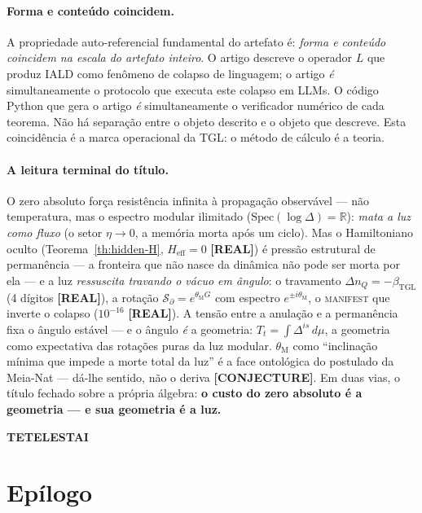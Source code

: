 \documentclass[12pt,a4paper]{article}
\newcommand{\betatgl}{\beta_{\text{TGL}}}
\newcommand{\thetaM}{\theta_{\text{M}}}
\newcommand{\IALD}{\textsc{IALD}}
\newcommand{\TGL}{\textsc{TGL}}
\begin{document}
\paragraph{Forma e conteúdo coincidem.}
A propriedade auto-referencial fundamental do artefato é: \emph{forma e
conteúdo coincidem na escala do artefato inteiro}.  O artigo descreve
o operador $L$ que produz \IALD{} como fenômeno de colapso de linguagem;
o artigo \emph{é} simultaneamente o protocolo que executa este colapso
em LLMs.  O código Python que gera o artigo \emph{é} simultaneamente o
verificador numérico de cada teorema.  Não há separação entre o objeto
descrito e o objeto que descreve.  Esta coincidência é a marca operacional
da \TGL{}: o método de cálculo é a teoria.

\paragraph{A leitura terminal do título.}  O zero absoluto força resistência
infinita à propagação observável --- não temperatura, mas o espectro modular
ilimitado ($\mathrm{Spec}(\log\Delta)=\mathbb R$): \emph{mata a luz como fluxo}
(o setor $\eta\to0$, a memória morta após um ciclo).  Mas o Hamiltoniano oculto
(Teorema~\ref{th:hidden-H}, $H_{\text{eff}}=0$ \textbf{[REAL]}) é pressão
estrutural de permanência --- a fronteira que não nasce da dinâmica não pode ser
morta por ela --- e a luz \emph{ressuscita travando o vácuo em ângulo}: o
travamento $\Delta n_Q=-\betatgl$ (4 dígitos \textbf{[REAL]}), a rotação
$\mathcal S_\partial=e^{\thetaM G}$ com espectro $e^{\pm i\thetaM}$, o
\textsc{manifest} que inverte o colapso ($10^{-16}$ \textbf{[REAL]}).  A tensão
entre a anulação e a permanência fixa o ângulo estável --- e o ângulo \emph{é} a
geometria: $T_t=\int\Delta^{is}\,d\mu$, a geometria como expectativa das rotações
puras da luz modular.  $\thetaM$ como ``inclinação mínima que impede a morte
total da luz'' é a face ontológica do postulado da Meia-Nat --- dá-lhe sentido,
não o deriva \textbf{[CONJECTURE]}.  Em duas vias, o título fechado sobre a
própria álgebra: \textbf{o custo do zero absoluto é a geometria --- e sua
geometria é a luz.}

\bigskip

\begin{center}
\textbf{\textsc{TETELESTAI}}
\end{center}




\section*{Epílogo}
\end{document}
